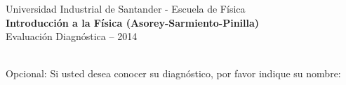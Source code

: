 \documentclass[a4paper,12pt]{article}
\begin{document}
\begin{center}
{\small{Universidad Industrial de Santander - Escuela de Física}}\\
{\bf{Introducción a la Física (Asorey-Sarmiento-Pinilla)}}\\
\vspace{0.7cm}
Evaluación Diagnóstica -- 2014
\end{center}

\\

\noindent Opcional: Si usted desea conocer su diagnóstico, por favor indique su nombre: \\
\end{document}
